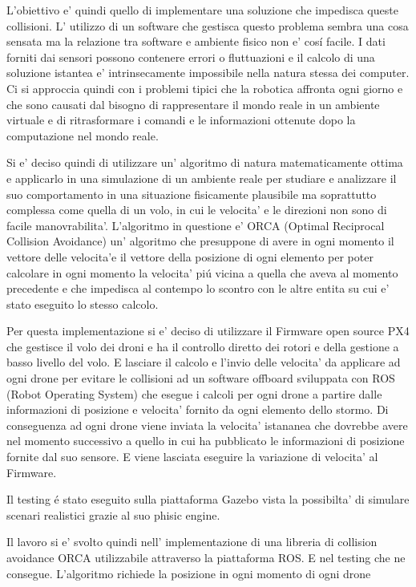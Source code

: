 L'obiettivo e' quindi quello di implementare una soluzione che impedisca queste collisioni. L' utilizzo di un software che gestisca questo problema sembra una cosa sensata ma la relazione tra software e ambiente fisico non e' cosí facile. I dati forniti dai sensori possono contenere errori o fluttuazioni e il calcolo di una soluzione istantea e' intrinsecamente impossibile nella natura stessa dei computer. Ci si approccia quindi con i problemi tipici che la robotica affronta ogni giorno e che sono causati dal bisogno di rappresentare il mondo reale in un ambiente virtuale e di ritrasformare i comandi e le informazioni ottenute dopo la computazione nel mondo reale.  

Si e' deciso quindi di utilizzare un' algoritmo di natura matematicamente ottima e applicarlo in una simulazione di un ambiente reale per studiare e analizzare il suo comportamento in una situazione fisicamente plausibile ma soprattutto complessa come quella di un volo, in cui le velocita' e le direzioni non sono di facile manovrabilita'.
L'algoritmo in questione e' ORCA (Optimal Reciprocal Collision Avoidance) un' algoritmo che presuppone di avere in ogni momento il vettore delle velocita'e il vettore della posizione di ogni elemento per poter calcolare in ogni momento la velocita'  piú vicina a quella che aveva al momento precedente e che impedisca al contempo lo scontro con le altre entita su cui e' stato eseguito lo stesso calcolo. 


Per questa implementazione si e' deciso di utilizzare il Firmware open source PX4 che gestisce il volo dei droni e ha il controllo diretto dei rotori e della gestione a basso livello del volo. E lasciare il calcolo e l'invio delle velocita' da applicare ad ogni drone per evitare le collisioni ad un software offboard sviluppata con ROS (Robot Operating System) che esegue i calcoli per ogni drone a partire dalle informazioni di posizione e velocita' fornito da ogni elemento dello stormo. Di conseguenza ad ogni drone viene inviata la velocita' istananea che dovrebbe avere nel momento successivo a quello in cui ha pubblicato le informazioni di posizione fornite dal suo sensore. E viene lasciata eseguire la variazione di velocita' al Firmware.

Il testing é stato eseguito sulla piattaforma Gazebo vista la possibilta' di simulare scenari realistici grazie al suo phisic engine.

Il lavoro si e' svolto quindi nell' implementazione di una libreria di collision avoidance ORCA utilizzabile attraverso la piattaforma ROS. E nel testing che ne consegue. L'algoritmo richiede la posizione in ogni momento di ogni drone 


